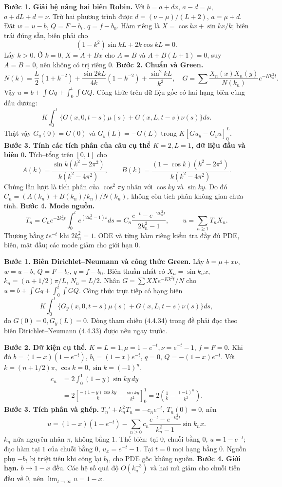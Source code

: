 \textbf{Bước 1. Giải hệ nâng hai biên Robin.}
Với $b=a+dx$, $a-d=\mu$, $a+dL+d=\nu$. Trừ hai phương trình được $d=(\nu-\mu)/(L+2)$, $a=\mu+d$. Đặt $w=u-b$, $Q=F-b_t$, $q=f-b_0$. Hàm riêng là $X=\cos kx+\sin kx/k$; biên trái đúng sẵn, biên phải cho
\[(1-k^2)\sin kL+2k\cos kL=0.\]
Lấy $k>0$. Ở $k=0$, $X=A+Bx$ cho $A=B$ và $A+B(L+1)=0$, suy $A=B=0$, nên không có trị riêng $0$.
\textbf{Bước 2. Chuẩn và Green.}
\[N(k)=\frac L2(1+k^{-2})+\frac{\sin2kL}{4k}(1-k^{-2})+\frac{\sin^2kL}{k^2},\quad
G=\sum\frac{X_n(x)X_n(y)}{N(k_n)}e^{-Kk_n^2t}.\]
Vậy $u=b+\int Gq+\int_0^t\int GQ$. Công thức trên dữ liệu gốc có hai hạng biên cùng dấu dương:
\[K\int_0^t\{G(x,0,t-s)\mu(s)+G(x,L,t-s)\nu(s)\}ds.\]
Thật vậy $G_y(0)=G(0)$ và $G_y(L)=-G(L)$ trong $K[Gu_y-G_yu]_0^L$.
\textbf{Bước 3. Tính các tích phân của câu cụ thể $K=2,L=1$, dữ liệu đầu và biên $0$.}
Tích–tổng trên $[0,1]$ cho
\[A(k)=\frac{\sin k(k^2-2\pi^2)}{k(k^2-4\pi^2)},\qquad
B(k)=\frac{(1-\cos k)(k^2-2\pi^2)}{k(k^2-4\pi^2)}.\]
Chúng lần lượt là tích phân của $\cos^2\pi y$ nhân với $\cos ky$ và $\sin ky$. Do đó $C_n=(A(k_n)+B(k_n)/k_n)/N(k_n)$, không còn tích phân không gian chưa tính.
\textbf{Bước 4. Mode nguồn.}
\[T_n=C_ne^{-2k_n^2t}\int_0^te^{(2k_n^2-1)s}ds
=C_n\frac{e^{-t}-e^{-2k_n^2t}}{2k_n^2-1},\qquad
u=\sum_{n\ge1}T_nX_n.\]
Thương bằng $te^{-t}$ khi $2k_n^2=1$. ODE và từng hàm riêng kiểm tra đầy đủ PDE, biên, mặt đầu; các mode giảm cho giới hạn $0$.

\textbf{Bước 1. Biên Dirichlet–Neumann và công thức Green.}
Lấy $b=\mu+x\nu$, $w=u-b$, $Q=F-b_t$, $q=f-b_0$. Biên thuần nhất có $X_n=\sin k_nx$, $k_n=(n+1/2)\pi/L$, $N_n=L/2$. Nhân $G=\sum XXe^{-Kk^2t}/N$ cho $u=b+\int Gq+\int_0^t\int GQ$. Công thức trực tiếp có hạng biên
\[K\int_0^t\{G_y(x,0,t-s)\mu(s)+G(x,L,t-s)\nu(s)\}ds,\]
do $G(0)=0,G_y(L)=0$. Dòng tham chiếu (4.4.34) trong đề phải đọc theo biên Dirichlet–Neumann (4.4.33) được nêu ngay trước.

\textbf{Bước 2. Dữ kiện cụ thể.}
$K=L=1,\mu=1-e^{-t},\nu=e^{-t}-1$, $f=F=0$. Khi đó $b=(1-x)(1-e^{-t})$, $b_t=(1-x)e^{-t}$, $q=0$, $Q=-(1-x)e^{-t}$.
Với $k=(n+1/2)\pi$, $\cos k=0,\sin k=(-1)^n$,
\begin{align*}
c_n&=2\int_0^1(1-y)\sin ky\,dy\\
&=2\left[\frac{-(1-y)\cos ky}k-\frac{\sin ky}{k^2}\right]_0^1
=2\left(\frac1k-\frac{(-1)^n}{k^2}\right).
\end{align*}
\textbf{Bước 3. Tích phân và ghép.}
$T_n'+k_n^2T_n=-c_ne^{-t}$, $T_n(0)=0$, nên
\[u=(1-x)(1-e^{-t})
-\sum_{n\ge0}c_n\frac{e^{-t}-e^{-k_n^2t}}{k_n^2-1}\sin k_nx.\]
$k_n$ nửa nguyên nhân $\pi$, không bằng $1$. Thế biên: tại $0$, chuỗi bằng $0$, $u=1-e^{-t}$; đạo hàm tại $1$ của chuỗi bằng $0$, $u_x=e^{-t}-1$. Tại $t=0$ mọi hạng bằng $0$. Nguồn phụ $-b_t$ bị triệt tiêu khi cộng lại $b_t$, cho PDE gốc không nguồn.
\textbf{Bước 4. Giới hạn.} $b\to1-x$ đều. Các hệ số quá độ $O(k_n^{-3})$ và hai mũ giảm cho chuỗi tiến đều về $0$, nên $\lim_{t\to\infty}u=1-x$.


